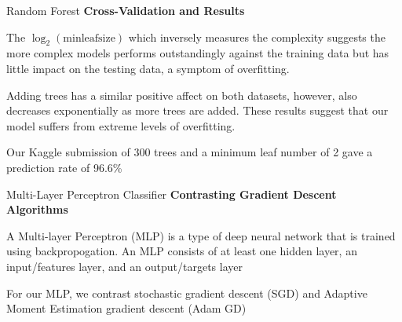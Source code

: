 \documentclass[titlepage,leqno]{beamer}%
\begin{document}
\begin{frame}[fragile]{Random Forest}
\small
\textbf{Cross-Validation and Results}

\medskip

The $\log_2(\text{minleafsize})$ which inversely measures the complexity suggests the more complex models performs outstandingly against the training data but has little impact on the testing data, a symptom of overfitting.

\vspace{3.75mm}

Adding trees has a similar positive affect on both datasets, however, also decreases exponentially as more trees are added. These results suggest that our model suffers from extreme levels of overfitting.

\vspace{3.75mm}
\begin{framed}
\centering
Our Kaggle submission of 300 trees and a minimum leaf number of 2 gave a prediction rate of 96.6\%
\end{framed}
\end{frame}
\begin{frame}{Multi-Layer Perceptron Classifier}
\textbf{Contrasting Gradient Descent Algorithms}
\vspace{3.75mm}

A Multi-layer Perceptron (MLP) is a type of deep neural network that is trained using backpropogation. An MLP consists of at least one hidden layer, an input/features layer, and an output/targets layer
\vspace{3.75mm}

For our MLP, we contrast stochastic gradient descent (SGD) and Adaptive Moment Estimation gradient descent (Adam GD)

\vspace{3.75mm}

\end{frame}
%
\end{document}
